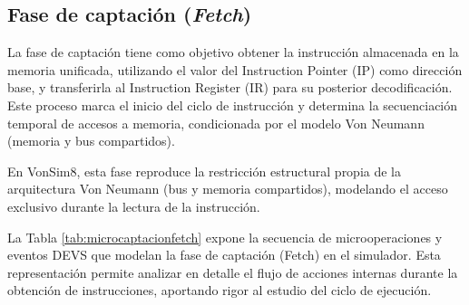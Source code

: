 \documentclass[12pt,oneside]{templates/unerthesis}
\begin{document}
\hypertarget{fase-de-captaciuxf3n-fetch}{%
\subsection{\texorpdfstring{Fase de captación (\emph{Fetch})}{Fase de captación (Fetch)}}\label{fase-de-captaciuxf3n-fetch}}

La fase de captación tiene como objetivo obtener la instrucción almacenada en la memoria unificada, utilizando el valor del Instruction Pointer (IP) como dirección base, y transferirla al Instruction Register (IR) para su posterior decodificación. Este proceso marca el inicio del ciclo de instrucción y determina la secuenciación temporal de accesos a memoria, condicionada por el modelo Von Neumann (memoria y bus compartidos).

En VonSim8, esta fase reproduce la restricción estructural propia de la arquitectura Von Neumann (bus y memoria compartidos), modelando el acceso exclusivo durante la lectura de la instrucción.

La Tabla \ref{tab:microcaptacionfetch} expone la secuencia de microoperaciones y eventos DEVS que modelan la fase de captación (Fetch) en el simulador. Esta representación permite analizar en detalle el flujo de acciones internas durante la obtención de instrucciones, aportando rigor al estudio del ciclo de ejecución.
\end{document}
